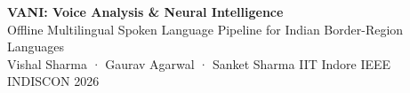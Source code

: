 \documentclass[11pt,a4paper]{article}
\begin{document}
\begin{tcolorbox}[enhanced,colback=Navy,colframe=Navy,arc=8pt,
  boxrule=0pt,left=14pt,right=14pt,top=12pt,bottom=10pt]
\centering
{\fontsize{24}{28}\selectfont\bfseries\color{white}
  VANI: Voice Analysis \& Neural Intelligence}\\[5pt]
{\large\color{SkyBg}
  Offline Multilingual Spoken Language Pipeline for Indian Border-Region Languages}\\[3pt]
{\normalsize\color{MGray}
  Vishal Sharma · Gaurav Agarwal · Sanket Sharma
  \quad\textbullet\quad IIT Indore
  \quad\textbullet\quad IEEE INDISCON 2026}
\end{tcolorbox}

\vspace{5pt}
\end{document}
